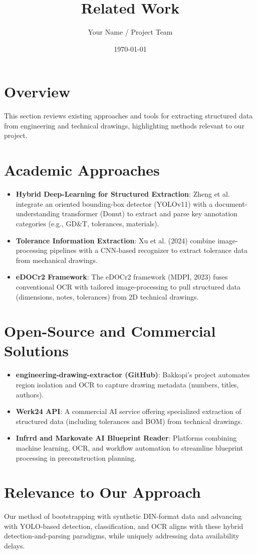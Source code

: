 \documentclass[a4paper,12pt]{article}
\title{Related Work}
\author{Your Name / Project Team}
\date{\today}
\begin{document}
\maketitle

\section*{Overview}
This section reviews existing approaches and tools for extracting structured data from engineering
and technical drawings, highlighting methods relevant to our project.

\section*{Academic Approaches}
\begin{itemize}[left=0pt]
  \item \textbf{Hybrid Deep-Learning for Structured Extraction}: Zheng et al. integrate an oriented
    bounding-box detector (YOLOv11) with a document-understanding transformer (Donut) to
    extract and parse key annotation categories (e.g., GD\&T, tolerances, materials).
  \item \textbf{Tolerance Information Extraction}: Xu et al. (2024) combine image-processing pipelines
    with a CNN-based recognizer to extract tolerance data from mechanical drawings.
  \item \textbf{eDOCr2 Framework}: The eDOCr2 framework (MDPI, 2023) fuses conventional OCR with
    tailored image-processing to pull structured data (dimensions, notes, tolerances) from 2D
    technical drawings.
\end{itemize}

\section*{Open-Source and Commercial Solutions}
\begin{itemize}[left=0pt]
  \item \textbf{engineering-drawing-extractor (GitHub)}: Bakkopi’s project automates region isolation
    and OCR to capture drawing metadata (numbers, titles, authors).
  \item \textbf{Werk24 API}: A commercial AI service offering specialized extraction of structured
    data (including tolerances and BOM) from technical drawings.
  \item \textbf{Infrrd and Markovate AI Blueprint Reader}: Platforms combining machine learning,
    OCR, and workflow automation to streamline blueprint processing in preconstruction planning.
\end{itemize}

\section*{Relevance to Our Approach}
Our method of bootstrapping with synthetic DIN-format data and advancing with YOLO-based detection,
classification, and OCR aligns with these hybrid detection-and-parsing paradigms, while uniquely
addressing data availability delays.
\end{document}

